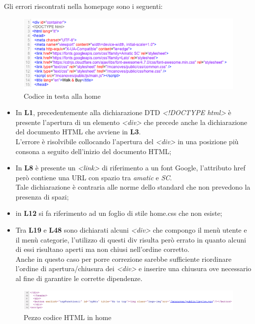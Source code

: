 	Gli errori riscontrati nella homepage sono i seguenti:
	\begin{figure}[H]
		\includegraphics[width=\linewidth]{res/img/home}
		\caption{Codice in testa alla home}
		\label{Codice in testa alla home}
	\end{figure}
	\begin{itemize}
		\item In \textbf{L1}, precedentemente alla dichiarazione DTD \textit{<!DOCTYPE html>} è presente l’apertura di un elemento \textit{<div>} che precede anche la dichiarazione del documento HTML che avviene in \textbf{L3}.\\
		L’errore è risolvibile collocando l’apertura del \textit{<div>} in una posizione più consona a seguito dell’inizio del documento HTML;
		\item In \textbf{L8} è presente un \textit{<link>} di riferimento a un font Google, l’attributo href però contiene una URL con spazio tra \textit{amatic} e \textit{SC}.\\
		Tale dichiarazione è contraria alle norme dello standard che non prevedono la presenza di spazi;
		\item in \textbf{L12} si fa riferimento ad un foglio di stile home.css che non esiste;
		\item Tra \textbf{L19} e \textbf{L48} sono dichiarati alcuni \textit{<div>} che compongo il menù utente e il menù categorie, l’utilizzo di questi div risulta però errato in quanto alcuni di essi risultano aperti ma non chiusi nell’ordine corretto.\\
		Anche in questo caso per porre correzione sarebbe sufficiente riordinare l’ordine di apertura/chiusura dei \textit{<div>} e inserire una chiusura ove necessario al fine di garantire le corrette dipendenze. 
		
	\end{itemize}
\newpage
\begin{figure}[H]
	\includegraphics[width=\linewidth]{res/img/home2}
	\caption{Pezzo codice HTML in home}
	\label{Pezzo codice HTML in home}
\end{figure}
